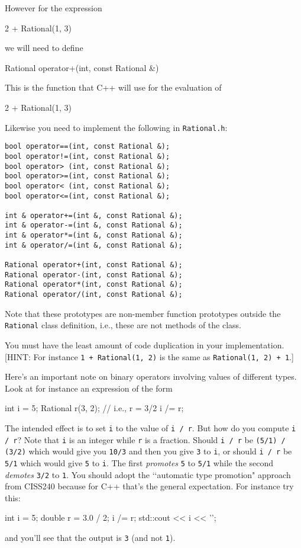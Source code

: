 However for the expression 
\begin{console}
2 + Rational(1, 3)
\end{console}
we will need to define
\begin{console}
Rational operator+(int, const Rational &)
\end{console}
This is the function that C++ will use for the evaluation of 
\begin{console}
2 + Rational(1, 3)
\end{console}

Likewise you need to implement the following in \texttt{Rational.h}:
\begin{Verbatim}[frame=single]
bool operator==(int, const Rational &);
bool operator!=(int, const Rational &);
bool operator> (int, const Rational &);
bool operator>=(int, const Rational &);
bool operator< (int, const Rational &);
bool operator<=(int, const Rational &);

int & operator+=(int &, const Rational &);
int & operator-=(int &, const Rational &);
int & operator*=(int &, const Rational &);
int & operator/=(int &, const Rational &);

Rational operator+(int, const Rational &);
Rational operator-(int, const Rational &);
Rational operator*(int, const Rational &);
Rational operator/(int, const Rational &);
\end{Verbatim}

Note that these prototypes are non-member function prototypes outside the
\texttt{Rational} class definition, i.e.,
these are not methods of the class.

You must have the least amount of code duplication in your implementation.
[HINT: For instance
\texttt{1 + Rational(1, 2)} is the same as \texttt{Rational(1, 2) + 1}.]

\textsc{}
Here's an important note on binary operators involving
values of different types.
Look at for instance an expression of the form
\begin{console}[fontsize=\small]
int i = 5;
Rational r(3, 2); // i.e., r = 3/2
i /= r;
\end{console}
The intended effect is to set \verb!i! to the value of \verb!i / r!.
But how do you compute \verb!i / r!?
Note that \verb!i! is an integer while \verb!r! is a fraction.
Should \verb!i / r! be \verb!(5/1) / (3/2)! which would give you \verb!10/3!
and then you give \verb!3! to \verb!i!, or 
should \verb!i / r! be \verb!5/1! which would give \verb!5! to \verb!i!.
The first \textit{promotes} \verb!5! to \verb!5/1! while the second
\textit{demotes} \verb!3/2! to \verb!1!.
You should adopt the \lq\lq automatic type promotion" approach from CISS240
because for C++ that's the general expectation.
For instance try this:
\begin{console}[fontsize=\small]
int i = 5;
double r = 3.0 / 2; 
i /= r;
std::cout << i << '\n';
\end{console}
and you'll see that the output is \verb!3! (and not \verb!1!).

